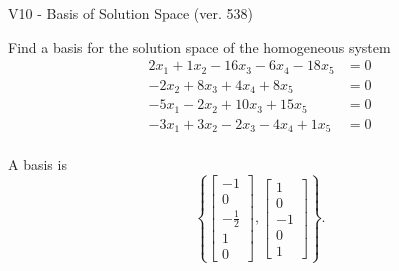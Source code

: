 \begin{exercise}
  \begin{exerciseTitle}V10 - Basis of Solution Space (ver. 538)\end{exerciseTitle}
  \begin{exerciseStatement}
    Find a basis for the solution space of the homogeneous system 
\begin{align*}
 2 x_ 1 + 1 x_ 2 -16 x_ 3 -6 x_ 4 -18 x_ 5 &= 0  \\ 
  -2 x_ 2 + 8 x_ 3 + 4 x_ 4 + 8 x_ 5 &= 0  \\ 
  -5 x_ 1 -2 x_ 2 + 10 x_ 3 + 15 x_ 5 &= 0  \\ 
  -3 x_ 1 + 3 x_ 2 -2 x_ 3 -4 x_ 4 + 1 x_ 5 &= 0  \\ 
 \end{align*}


 
  \end{exerciseStatement}

  \begin{exerciseAnswer}
   A basis is   
\[\left\{\left[\begin{array}{c}
-1 \\
0 \\
-\frac{1}{2} \\
1 \\
0
\end{array}\right] , \left[\begin{array}{c}
1 \\
0 \\
-1 \\
0 \\
1
\end{array}\right]\right\}.\]

  


  \end{exerciseAnswer}
\end{exercise}